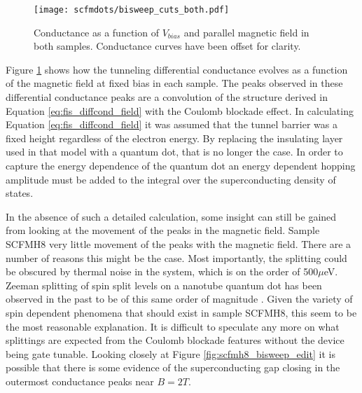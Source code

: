 \begin{figure}
    \centering
    \texttt{[image: scfmdots/bisweep\_cuts\_both.pdf]}
    \caption{Conductance as a function of $V_{bias}$ and parallel magnetic field in both samples. Conductance curves have been offset for clarity.}
    \label{fig:bisweep_cuts_all}
\end{figure}

Figure \ref{fig:bisweep_cuts_all} shows how the tunneling differential conductance evolves as a function of the magnetic field at fixed bias in each sample. The peaks observed in these differential conductance peaks are a convolution of the structure derived in Equation \ref{eq:fis_diffcond_field} with the Coulomb blockade effect. In calculating Equation \ref{eq:fis_diffcond_field} it was assumed that the tunnel barrier was a fixed height regardless of the electron energy. By replacing the insulating layer used in that model with a quantum dot, that is no longer the case. In order to capture the energy dependence of the quantum dot an energy dependent hopping amplitude must be added to the integral over the superconducting density of states.

In the absence of such a detailed calculation, some insight can still be gained from looking at the movement of the peaks in the magnetic field. Sample SCFMH8 very little movement of the peaks with the magnetic field. There are a number of reasons this might be the case. Most importantly, the splitting could be obscured by thermal noise in the system, which is on the order of 500$\mu$eV. Zeeman splitting of spin split levels on a nanotube quantum dot has been observed in the past to be of this same order of magnitude \cite{Tans1997}. Given the variety of spin dependent phenomena that should exist in sample SCFMH8, this seem to be the most reasonable explanation. It is difficult to speculate any more on what splittings are expected from the Coulomb blockade features without the device being gate tunable. Looking closely at Figure \ref{fig:scfmh8_bisweep_edit} it is possible that there is some evidence of the superconducting gap closing in the outermost conductance peaks near $B=2T$.

